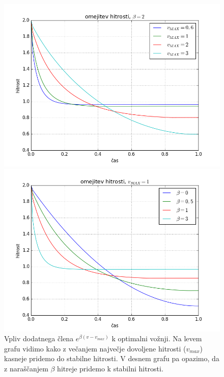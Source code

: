 \documentclass[slovene,11pt,a4paper]{article}
\numberwithin{equation}{section} %
\numberwithin{figure}{section} %
\numberwithin{table}{section} %
\begin{document}
\begin{figure}[h]
{\begin{minipage}[t]{0.5\paperwidth}
\begin{flushleft}
\includegraphics[scale=0.5]{slike/omejitev_hitrosti_beta_konstantna.png}
\hspace{\fill}
\end{flushleft}
\end{minipage}
\begin{minipage}[t]{0.5\paperwidth}
\includegraphics[scale=0.5]{slike/omejitev_hitrosti_v_max_konstantna.png}
\end{minipage}%
}
\caption{Vpliv dodatnega člena $e^{\beta (v-v_{max})}$ k optimalni vožnji. Na levem grafu vidimo kako z večanjem največje dovoljene hitrosti ($v_{max}$) kasneje pridemo do stabilne hitrosti. V desnem grafu pa opazimo, da z naraščanjem $\beta$ hitreje pridemo k stabilni hitrosti.}
\end{figure}









\pagebreak
\end{document}
